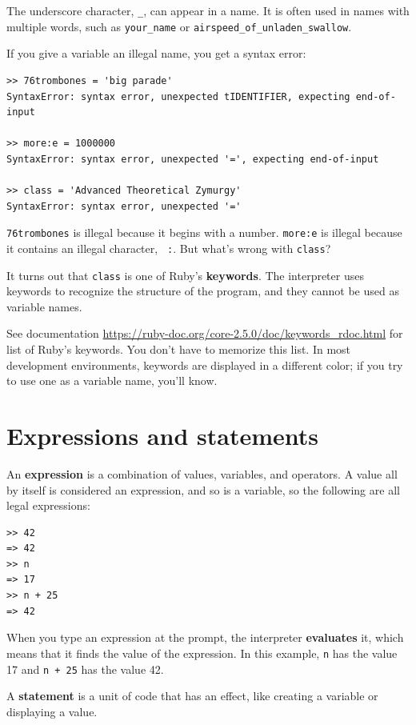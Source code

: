 \documentclass[10pt]{book}
\begin{document}
The underscore character, \verb"_", can appear in a name.
It is often used in names with multiple words, such as
\verb"your_name" or \verb"airspeed_of_unladen_swallow".

If you give a variable an illegal name, you get a syntax error:

\begin{verbatim}
>> 76trombones = 'big parade'
SyntaxError: syntax error, unexpected tIDENTIFIER, expecting end-of-input

>> more:e = 1000000
SyntaxError: syntax error, unexpected '=', expecting end-of-input

>> class = 'Advanced Theoretical Zymurgy'
SyntaxError: syntax error, unexpected '='
\end{verbatim}
%
{\tt 76trombones} is illegal because it begins with a number.
{\tt more:e} is illegal because it contains an illegal character, {\tt
:}.  But what's wrong with {\tt class}?

It turns out that {\tt class} is one of Ruby's {\bf keywords}.  The
interpreter uses keywords to recognize the structure of the program,
and they cannot be used as variable names.

See documentation \url{https://ruby-doc.org/core-2.5.0/doc/keywords_rdoc.html} for list of
Ruby's keywords.  You don't have to memorize this list.  In most development environments,
keywords are displayed in a different color; if you try to use one
as a variable name, you'll know.


\section{Expressions and statements}

An {\bf expression} is a combination of values, variables, and operators.
A value all by itself is considered an expression, and so is
a variable, so the following are all legal expressions:

\begin{verbatim}
>> 42
=> 42
>> n
=> 17
>> n + 25
=> 42
\end{verbatim}
%
When you type an expression at the prompt, the interpreter
{\bf evaluates} it, which means that it finds the value of
the expression.
In this example, {\tt n} has the value 17 and
{\tt n + 25} has the value 42.

A {\bf statement} is a unit of code that has an effect, like
creating a variable or displaying a value.  
\end{document}
